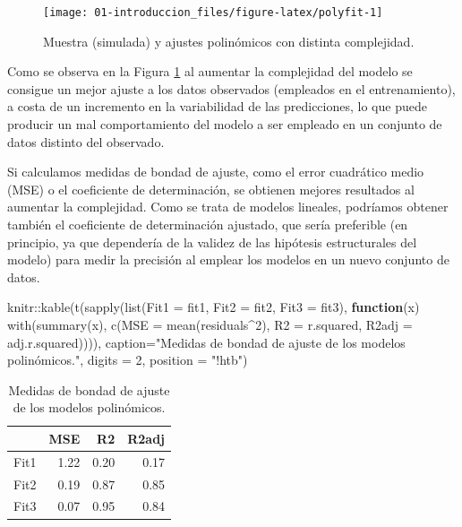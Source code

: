 \documentclass[
  spanish,
]{book}
\newenvironment{Shaded}{\begin{snugshade}}{\end{snugshade}}
\newcommand{\AttributeTok}[1]{\textcolor[rgb]{0.77,0.63,0.00}{#1}}
\newcommand{\ControlFlowTok}[1]{\textcolor[rgb]{0.13,0.29,0.53}{\textbf{#1}}}
\newcommand{\DecValTok}[1]{\textcolor[rgb]{0.00,0.00,0.81}{#1}}
\newcommand{\FunctionTok}[1]{\textcolor[rgb]{0.00,0.00,0.00}{#1}}
\newcommand{\NormalTok}[1]{#1}
\newcommand{\SpecialCharTok}[1]{\textcolor[rgb]{0.00,0.00,0.00}{#1}}
\newcommand{\StringTok}[1]{\textcolor[rgb]{0.31,0.60,0.02}{#1}}
\theoremstyle{break}
\theoremstyle{definition}
\theoremstyle{definition}
\theoremstyle{definition}
\theoremstyle{definition}
\theoremstyle{remark}
\begin{document}
\begin{figure}[!htb]

{\centering \texttt{[image: 01-introduccion\_files/figure-latex/polyfit-1]} 

}

\caption{Muestra (simulada) y ajustes polinómicos con distinta complejidad.}\label{fig:polyfit}
\end{figure}

Como se observa en la Figura \ref{fig:polyfit} al aumentar la complejidad del modelo se consigue un mejor ajuste a los datos observados (empleados en el entrenamiento), a costa de un incremento en la variabilidad de las predicciones, lo que puede producir un mal comportamiento del modelo a ser empleado en un conjunto de datos distinto del observado.

Si calculamos medidas de bondad de ajuste, como el error cuadrático medio (MSE) o el coeficiente de determinación, se obtienen mejores resultados al aumentar la complejidad.
Como se trata de modelos lineales, podríamos obtener también el coeficiente de determinación ajustado, que sería preferible (en principio, ya que dependería de la validez de las hipótesis estructurales del modelo) para medir la precisión al emplear los modelos en un nuevo conjunto de datos.

\begin{Shaded}
\begin{Highlighting}[]
\NormalTok{knitr}\SpecialCharTok{::}\FunctionTok{kable}\NormalTok{(}\FunctionTok{t}\NormalTok{(}\FunctionTok{sapply}\NormalTok{(}\FunctionTok{list}\NormalTok{(}\AttributeTok{Fit1 =}\NormalTok{ fit1, }\AttributeTok{Fit2 =}\NormalTok{ fit2, }\AttributeTok{Fit3 =}\NormalTok{ fit3), }
    \ControlFlowTok{function}\NormalTok{(x) }\FunctionTok{with}\NormalTok{(}\FunctionTok{summary}\NormalTok{(x), }
        \FunctionTok{c}\NormalTok{(}\AttributeTok{MSE =} \FunctionTok{mean}\NormalTok{(residuals}\SpecialCharTok{\^{}}\DecValTok{2}\NormalTok{), }\AttributeTok{R2 =}\NormalTok{ r.squared, }\AttributeTok{R2adj =}\NormalTok{ adj.r.squared)))), }
    \AttributeTok{caption=}\StringTok{"Medidas de bondad de ajuste de los modelos polinómicos."}\NormalTok{, }\AttributeTok{digits =} \DecValTok{2}\NormalTok{, }\AttributeTok{position =} \StringTok{"!htb"}\NormalTok{)}
\end{Highlighting}
\end{Shaded}

\begin{table}[!htb]

\caption{\label{tab:unnamed-chunk-2}Medidas de bondad de ajuste de los modelos polinómicos.}
\centering
\begin{tabular}[t]{l|r|r|r}
\hline
  & MSE & R2 & R2adj\\
\hline
Fit1 & 1.22 & 0.20 & 0.17\\
\hline
Fit2 & 0.19 & 0.87 & 0.85\\
\hline
Fit3 & 0.07 & 0.95 & 0.84\\
\hline
\end{tabular}
\end{table}
\end{document}
